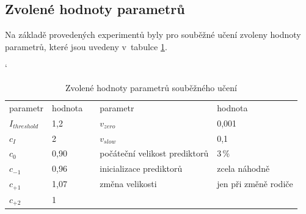 \subsection{Zvolené hodnoty parametrů}

Na základě provedených experimentů byly pro souběžné učení zvoleny hodnoty parametrů, které jsou uvedeny v~tabulce \ref{tabParams}.


\begin{table}[h]
    \caption{Zvolené hodnoty parametrů souběžného učení}
    \renewcommand{\arraystretch}{1.2}
    \catcode`
    \centering
    \begin{tabular}{|l|l|c|l|l|}
        \cline{1-2}\cline{4-5}
        parametr & hodnota & & parametr & hodnota \\
        \cline{1-2}\cline{4-5}
        $I_\mathit{threshold}$ & 1,2   & & $v_\mathit{zero}$ & 0,001 \\
        $c_I$ & 2                      & & $v_\mathit{slow}$ & 0,1 \\
        $c_0$ & 0,90                   & & počáteční velikost prediktorů & 3\,\% \\
        $c_{-1}$ & 0,96                & & inicializace prediktorů & zcela náhodně \\
        $c_{+1}$ & 1,07                & & změna velikosti & jen při změně rodiče \\
        $c_{+2}$ & 1                   & & &\\
        \cline{1-2}\cline{4-5}
    \end{tabular}
    \label{tabParams}
\end{table}



